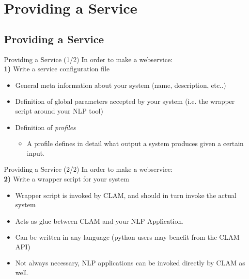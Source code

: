 \documentclass[compress]{beamer}
\begin{document}
\section{Providing a Service}

\subsection{Providing a Service}

\begin{frame}
    \begin{block}{Providing a Service (1/2)}
        In order to make a webservice: \\       
        \textbf{1)} Write a service configuration file
        \begin{itemize}
            \item General meta information about your system {\footnotesize{(name, description, etc..)}}
            \item Definition of global parameters accepted by your system {\footnotesize{(i.e. the wrapper script around your NLP tool)}}
            \item Definition of \emph{profiles}
            \begin{itemize}
                \item A profile defines in detail what output a system produces given a certain input.                    
            \end{itemize}
        \end{itemize}    
    
    \end{block}

\end{frame}            

\begin{frame}
    \begin{block}{Providing a Service (2/2)}
        In order to make a webservice: \\
        \textbf{2)} Write a wrapper script for your system
        \begin{itemize}
            \item Wrapper script is invoked by CLAM, and should in turn invoke the actual system
            \item Acts as glue between CLAM and your NLP Application.
            \item Can be written in any language (python users may benefit from the CLAM API)
            \item Not always necessary, NLP applications can be invoked directly by CLAM as well.
        \end{itemize}
    
    \end{block}

\end{frame}
\end{document}

